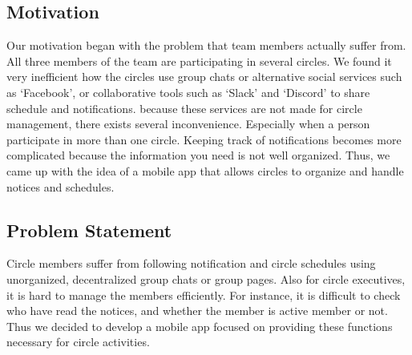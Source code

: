 \documentclass[conference]{IEEEtran}
\begin{document}
\subsection{Motivation}
Our motivation began with the problem that team members actually suffer from. All three members of the team are participating in several circles. We found it very inefficient how the circles use group chats or alternative social services such as `Facebook', or collaborative tools such as `Slack' and `Discord' to share schedule and notifications. because these services are not made for circle management, there exists several inconvenience. Especially when a person participate in more than one circle. Keeping track of notifications becomes more complicated because the information you need is not well organized. Thus, we came up with the idea of a mobile app that allows circles to organize and handle notices and schedules.

\subsection{Problem Statement}
Circle members suffer from following notification and circle schedules using unorganized, decentralized group chats or group pages. Also for circle executives, it is hard to manage the members efficiently. For instance, it is difficult to check who have read the notices, and whether the member is active member or not. Thus we decided to develop a mobile app focused on providing these functions necessary for circle activities.
\end{document}
